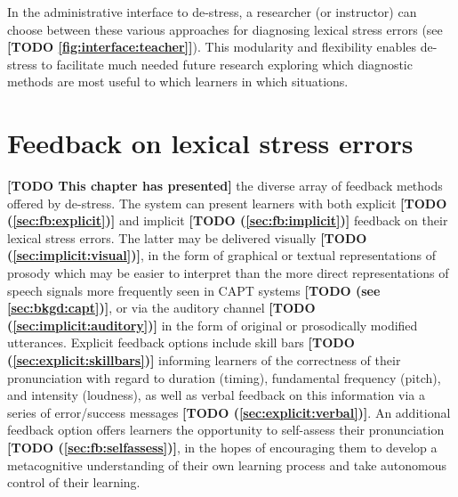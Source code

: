 \documentclass[11pt,a4paper,onecolumn]{article}
\newcommand{\TODO}[1]{{\color{red}\textbf{[TODO #1]}}}
\begin{document}
	
	In the administrative interface to de-stress, a researcher (or instructor) can choose between these various approaches for diagnosing lexical stress errors (see \TODO{\cref{fig:interface:teacher}}).
	This modularity and flexibility enables de-stress to facilitate much needed future research  exploring which diagnostic methods are most useful to which learners in which situations. %

\section{Feedback on lexical stress errors}

\TODO{This chapter has presented} the diverse array of feedback methods offered by de-stress. The system can present learners with both explicit \TODO{(\cref{sec:fb:explicit})} and implicit \TODO{(\cref{sec:fb:implicit})} feedback on their lexical stress errors. The latter may be delivered visually \TODO{(\cref{sec:implicit:visual})}, in the form of graphical  or textual representations of prosody which may be easier to interpret than the more direct representations of speech signals more frequently seen in CAPT systems \TODO{(see \cref{sec:bkgd:capt})}, or via the auditory channel \TODO{(\cref{sec:implicit:auditory})} in the form of original or prosodically modified utterances. Explicit feedback options include skill bars \TODO{(\cref{sec:explicit:skillbars})} informing learners of the correctness of their pronunciation with regard to duration (timing), fundamental frequency (pitch), and intensity (loudness), as well as verbal feedback on this information via a series of error/success messages \TODO{(\cref{sec:explicit:verbal})}. An additional feedback option offers learners the opportunity to self-assess their pronunciation \TODO{(\cref{sec:fb:selfassess})}, in the hopes of encouraging them to develop a metacognitive understanding of their own learning process and take autonomous control of their learning.
\end{document}
